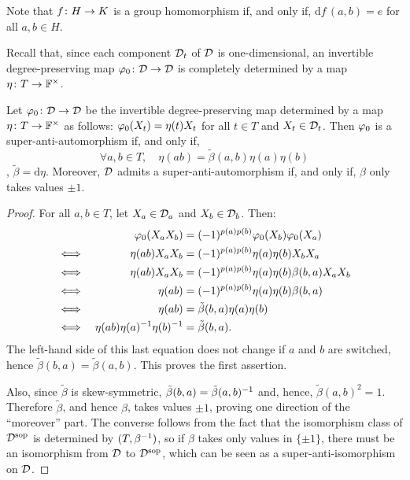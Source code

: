 Note that $f\colon H \to K$ is a group homomorphism if, and only if, $\mathrm{d} f\, (a,b) = e$ for all $a,b \in H$. 

Recall that, since each component $\mathcal{D}_t$ of $\mathcal{D}$ is one-dimensional, an invertible degree-preserving map $\varphi_0\colon \mathcal{D} \to \mathcal{D}$ is completely determined by a map $\eta\colon T \to \mathbb{F}^\times$.

\begin{prop}\label{prop:superpolarization}
	Let $\varphi_0\colon \mathcal{D} \to \mathcal{D}$ be the invertible degree-preserving map determined by a map $\eta\colon T \to \mathbb{F}^\times$ as follows: $\varphi_0(X_t) = \eta(t) X_t$ for all $t\in T$ and $X_t\in \mathcal{D}_t$.
	Then $\varphi_0$ is a super-anti-automorphism if, and only if, 
	\begin{equation}\label{eq:superpolarization}
		\forall a,b\in T, \quad \eta(ab) = \tilde\beta(a,b) \eta(a) \eta(b)
	\end{equation}
	\ie, $\tilde\beta = \mathrm{d}\eta$. 
	Moreover, $\mathcal{D}$ admits a super-anti-automorphism if, and only if, $\beta$ only takes values $\pm 1$.
\end{prop}

\begin{proof}
	For all $a,b \in T$, let $X_a \in \mathcal{D}_a$ and $X_b\in \mathcal{D}_b$. 
	Then:
	\begin{alignat*}{2}
		     &  & \varphi_0(X_a X_b)             & = (-1)^{p(a) p(b)} \varphi_0(X_b) \varphi_0(X_a)          \\
		\iff &  & \,\, \eta(ab)X_a X_b         & = (-1)^{p(a) p(b)} \eta(a) \eta(b) X_b X_a            \\
		\iff &  & \, \eta(ab)X_a X_b           & = (-1)^{p(a) p(b)} \eta(a) \eta(b) \beta(b,a) X_a X_b \\
		\iff &  & \eta(ab)                     & = (-1)^{p(a) p(b)} \eta(a) \eta(b) \beta(b,a)
		\\
		\iff &  & \eta(ab)                     & = \tilde\beta(b,a) \eta(a) \eta(b)
		\\
		\iff &  & \eta(ab) \eta(a)^{-1} \eta(b)^{-1} & = \tilde\beta(b,a). 
	\end{alignat*}
	The left-hand side of this last equation does not change if $a$ and $b$ are switched, hence $\tilde\beta(b,a) = \tilde\beta(a,b)$. 
	This proves the first assertion. 

	Also, since $\tilde\beta$ is skew-symmetric, $\tilde\beta(b, a) = \tilde\beta (a, b)^{-1}$ and, hence, $\tilde\beta(a,b)^2 = 1$. 
	Therefore $\tilde\beta$, and hence $\beta$, takes values $\pm 1$, proving one direction of the ``moreover'' part.
	The converse follows from the fact that the isomorphism class of $\mathcal{D}^{\mathrm{sop}}$ is determined by $(T, \beta^{-1})$, so if $\beta$ takes only values in $\{ \pm 1 \}$, there must be an isomorphism from $\mathcal{D}$ to $\mathcal{D}^{\mathrm{sop}}$, which can be seen as a super-anti-isomorphism on $\mathcal{D}$.
\end{proof}

